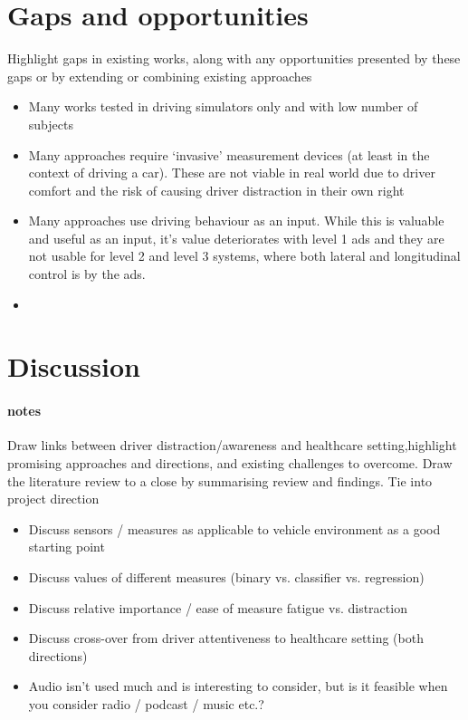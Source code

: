 \documentclass[11pt, parskip=half*,twoside=false]{scrbook}
\begin{document}
\section{Gaps and opportunities}
Highlight gaps in existing works, along with any opportunities presented by these gaps or by extending or combining existing approaches

\begin{itemize}
	\item Many works tested in driving simulators only and with low number of subjects
	\item Many approaches require `invasive' measurement devices (at least in the context of driving a car). These are not viable in real world due to driver comfort and the risk of causing driver distraction in their own right
	\item Many approaches use driving behaviour as an input. While this is valuable and useful as an input, it's value deteriorates with level 1 \gls{ads} and they are not usable for level 2 and level 3 systems, where both lateral and longitudinal control is by the \gls{ads}.
	\item 
\end{itemize}

\section{Discussion}
\paragraph{notes}
Draw links between driver distraction/awareness and healthcare setting,highlight promising approaches and directions, and existing challenges to overcome. Draw the literature review to a close by summarising review and findings. Tie into project direction

\begin{itemize}
	\item Discuss sensors / measures as applicable to vehicle environment \citep{crayeMultiModalDriverFatigue2016} as a good starting point
	\item Discuss values of different measures (binary vs. classifier vs. regression)
	\item Discuss relative importance / ease of measure fatigue vs. distraction
	\item Discuss cross-over from driver attentiveness to healthcare setting (both directions)
	\item Audio isn't used much and is interesting to consider, but is it feasible when you consider radio / podcast / music etc.?
\end{itemize}
\end{document}
